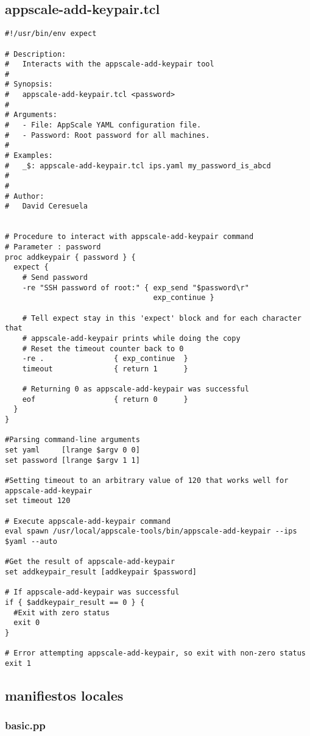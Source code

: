\subsection{appscale-add-keypair.tcl}


\begin{lstlisting}
#!/usr/bin/env expect

# Description:
#   Interacts with the appscale-add-keypair tool
#
# Synopsis:
#   appscale-add-keypair.tcl <password>
#
# Arguments:
#   - File: AppScale YAML configuration file.
#   - Password: Root password for all machines.
#
# Examples:
#   _$: appscale-add-keypair.tcl ips.yaml my_password_is_abcd
#
#
# Author:
#   David Ceresuela


# Procedure to interact with appscale-add-keypair command
# Parameter : password 
proc addkeypair { password } {
  expect {
    # Send password
    -re "SSH password of root:" { exp_send "$password\r"
                                  exp_continue }
    
    # Tell expect stay in this 'expect' block and for each character that
    # appscale-add-keypair prints while doing the copy
    # Reset the timeout counter back to 0
    -re .                { exp_continue  }
    timeout              { return 1      }
    
    # Returning 0 as appscale-add-keypair was successful
    eof                  { return 0      }
  }
}

#Parsing command-line arguments
set yaml     [lrange $argv 0 0]
set password [lrange $argv 1 1]

#Setting timeout to an arbitrary value of 120 that works well for appscale-add-keypair
set timeout 120

# Execute appscale-add-keypair command
eval spawn /usr/local/appscale-tools/bin/appscale-add-keypair --ips $yaml --auto

#Get the result of appscale-add-keypair
set addkeypair_result [addkeypair $password]

# If appscale-add-keypair was successful
if { $addkeypair_result == 0 } {
  #Exit with zero status
  exit 0
}

# Error attempting appscale-add-keypair, so exit with non-zero status
exit 1
\end{lstlisting}


\subsection{manifiestos locales}
\subsubsection{basic.pp}

